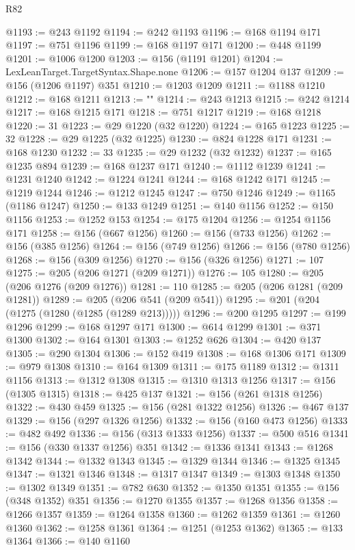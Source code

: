 \begin{lexlean}{R82}
\begin{coremodule}
{@1193 := @243 @1192
@1194 := @242 @1193
@1196 := @168 @1194 @171
@1197 := @751 @1196
@1199 := @168 @1197 @171
@1200 := @448 @1199
@1201 := @1006 @1200
@1203 := @156 (@1191 @1201)
@1204 := LexLeanTarget.TargetSyntax.Shape.none
@1206 := @157 @1204 @137
@1209 := @156 (@1206 @1197) @351
@1210 := @1203 @1209
@1211 := @1188 @1210
@1212 := @168 @1211
@1213 := "}"
@1214 := @243 @1213
@1215 := @242 @1214
@1217 := @168 @1215 @171
@1218 := @751 @1217
@1219 := @168 @1218
@1220 := 31
@1223 := @29 @1220 (@32 @1220)
@1224 := @165 @1223
@1225 := 32
@1228 := @29 @1225 (@32 @1225)
@1230 := @824 @1228 @171
@1231 := @168 @1230
@1232 := 33
@1235 := @29 @1232 (@32 @1232)
@1237 := @165 @1235 @894
@1239 := @168 @1237 @171
@1240 := @1112 @1239
@1241 := @1231 @1240
@1242 := @1224 @1241
@1244 := @168 @1242 @171
@1245 := @1219 @1244
@1246 := @1212 @1245
@1247 := @750 @1246
@1249 := @1165 (@1186 @1247)
@1250 := @133 @1249
@1251 := @140 @1156
@1252 := @150 @1156
@1253 := @1252 @153
@1254 := @175 @1204
@1256 := @1254 @1156 @171
@1258 := @156 (@667 @1256)
@1260 := @156 (@733 @1256)
@1262 := @156 (@385 @1256)
@1264 := @156 (@749 @1256)
@1266 := @156 (@780 @1256)
@1268 := @156 (@309 @1256)
@1270 := @156 (@326 @1256)
@1271 := 107
@1275 := @205 (@206 @1271 (@209 @1271))
@1276 := 105
@1280 := @205 (@206 @1276 (@209 @1276))
@1281 := 110
@1285 := @205 (@206 @1281 (@209 @1281))
@1289 := @205 (@206 @541 (@209 @541))
@1295 := @201 (@204 (@1275 (@1280 (@1285 (@1289 @213)))))
@1296 := @200 @1295
@1297 := @199 @1296
@1299 := @168 @1297 @171
@1300 := @614 @1299
@1301 := @371 @1300
@1302 := @164 @1301
@1303 := @1252 @626
@1304 := @420 @137
@1305 := @290 @1304
@1306 := @152 @419
@1308 := @168 @1306 @171
@1309 := @979 @1308
@1310 := @164 @1309
@1311 := @175 @1189
@1312 := @1311 @1156
@1313 := @1312 @1308
@1315 := @1310 @1313 @1256
@1317 := @156 (@1305 @1315)
@1318 := @425 @137
@1321 := @156 (@261 @1318 @1256)
@1322 := @430 @459
@1325 := @156 (@281 @1322 @1256)
@1326 := @467 @137
@1329 := @156 (@297 @1326 @1256)
@1332 := @156 (@160 @473 @1256)
@1333 := @482 @492
@1336 := @156 (@313 @1333 @1256)
@1337 := @500 @516
@1341 := @156 (@330 @1337 @1256) @351
@1342 := @1336 @1341
@1343 := @1268 @1342
@1344 := @1332 @1343
@1345 := @1329 @1344
@1346 := @1325 @1345
@1347 := @1321 @1346
@1348 := @1317 @1347
@1349 := @1303 @1348
@1350 := @1302 @1349
@1351 := @782 @630
@1352 := @1350 @1351
@1355 := @156 (@348 @1352) @351
@1356 := @1270 @1355
@1357 := @1268 @1356
@1358 := @1266 @1357
@1359 := @1264 @1358
@1360 := @1262 @1359
@1361 := @1260 @1360
@1362 := @1258 @1361
@1364 := @1251 (@1253 @1362)
@1365 := @133 @1364
@1366 := @140 @1160

\end{coremodule}
\end{lexlean}
